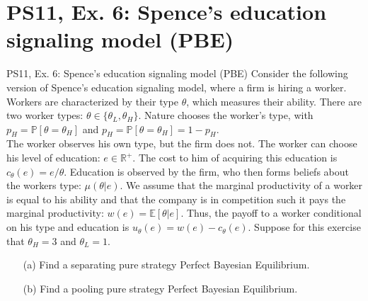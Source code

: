 \section{PS11, Ex. 6: Spence’s education signaling model (PBE)}

\begin{frame}{PS11, Ex. 6: Spence’s education signaling model (PBE)}
    Consider the following version of Spence’s education signaling model, where a firm is hiring a worker. Workers are characterized by their type $\theta$, which measures their ability. There are two worker types: $\theta\in\{\theta_L,\theta_H\}$. Nature chooses the worker’s type, with $p_H = \mathbb{P}[\theta = \theta_H]$ and $p_H = \mathbb{P}[\theta = \theta_H]=1-p_H$.\\\smallskip
    The worker observes his own type, but the firm does not. The worker can choose his level of education: $e\in\mathbb{R}^{+}$. The cost to him of acquiring this education is $c_\theta(e) = e/\theta$. Education is observed by the firm, who then forms beliefs about the workers type: $\mu(\theta|e)$. We assume that the marginal productivity of a worker is equal to his ability and that the company is in competition such it pays the marginal productivity: $w(e) = \mathbb{E}[\theta|e]$. Thus, the payoff to a worker conditional on his type and education is $u_\theta(e)=w(e)-c_\theta(e)$. Suppose for this exercise that $\theta_H=3$ and $\theta_L=1$.\vspace{-4pt}
    \begin{itemize}
      \item[(a)] Find a separating pure strategy Perfect Bayesian Equilibrium.
      \item[(b)] Find a pooling pure strategy Perfect Bayesian Equilibrium.
    \end{itemize}
    \begin{multicols}{2}
      \vfill\null\columnbreak
      \vfill\null
    \end{multicols}
\end{frame}
